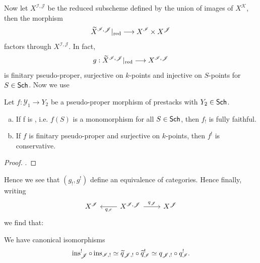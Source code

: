 \documentclass[oneside]{amsart}
\newcommand{\CI}{\mathcal{I}}
\newcommand{\CY}{\mathcal{Y}}
\newcommand{\CJ}{\mathcal{J}}
\newcommand{\CK}{\mathcal{K}}
\begin{document}
Now let $X^{\CI,\CJ}$ be the reduced subscheme defined by the union of images of $X^{\CK}$, then the morphism
\[
	\wt{X}^{\CI,\CJ}|\red \to X^{\CI}\times X^{\CJ}
\] 
factors through $X^{\CI,\CJ}$. In fact,
\[
	g:\wt{X}^{\CI,\CJ}|\red \to X^{\CI,\CJ}
\] 
is finitary pseudo-proper, surjective on $k$-points and injective on $S$-points for $S\in \mathsf{Sch}$. Now we use
\begin{lemma}
	Let $f:\CY_1\to Y_2$ be a pseudo-proper morphism of prestacks with $Y_2\in \mathsf{Sch}$.
	\begin{enumerate}[(a)]
		\item If f is , i.e. $f(S)$ is a monomorphism for all $S\in \mathsf{Sch}$, then $f_!$ is fully faithful.
		\item If $f$ is finitary pseudo-proper and surjective on $k$-points, then $f^{!}$ is conservative.
	\end{enumerate}
\end{lemma}
\begin{proof}
	\cite[Lemma~7.4.11]{abott}.
\end{proof}
Hence we see that $(g_!,g^!)$ define an equivalence of categories. Hence finally, writing
\[
\begin{tikzcd}
	X^{\CI} & X^{\CI,\CJ} \ar[l,"q_{\CI}"] \ar[r,"q_{\CJ}"] & X^{\CJ}
\end{tikzcd}
\] 
we find that:
\begin{corollary}
	We have canonical isomorphisms
	\[
		\ins_\CJ^{!}\circ \ins_{\CI,!} \isoto \wt{q}_{\CJ,!}\circ \wt{q}_{\CI}^{!} \isoto q_{\CJ,!}\circ q_{\CI}^{!}.
	\] 
\end{corollary}

\appendix
\printbibliography
\end{document}
